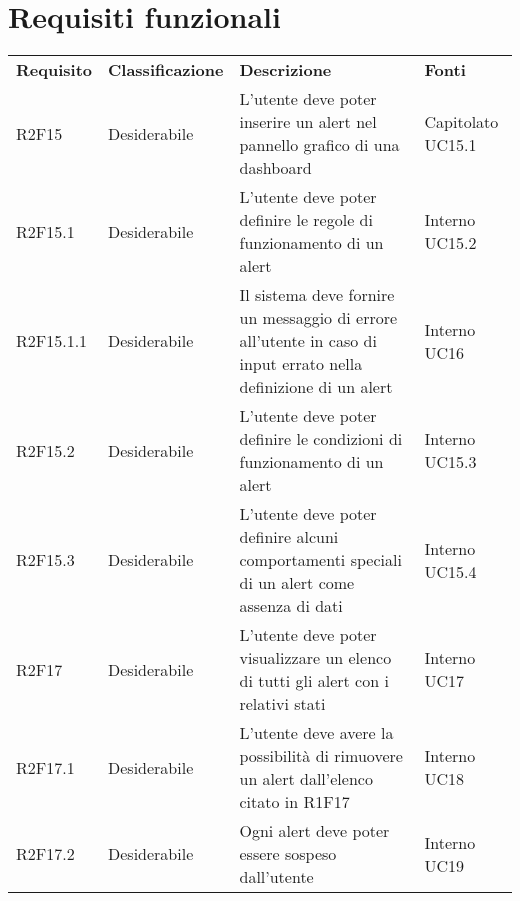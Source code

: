 \section{Requisiti funzionali}
	\begin{longtable} {
		>{}p{24mm} 
		>{}p{32mm}
		>{}p{40mm} 
		>{}p{24.5mm}
		}
	\rowcolor{gray!50}
		\textbf{Requisito} & 
		\textbf{Classificazione} & 
		\textbf{Descrizione} & 
		\textbf{Fonti} 	\TBstrut \\
			
		R2F15 &
		Desiderabile &
		L'utente deve poter inserire un alert nel pannello grafico di una dashboard\glo &
		Capitolato UC15.1 \TBstrut \\ [2mm]
		
		R2F15.1 &
		Desiderabile &
		L'utente deve poter definire le regole di funzionamento di un alert &
		Interno UC15.2 \TBstrut \\ [2mm]
		
		R2F15.1.1 &
		Desiderabile &
		Il sistema deve fornire un messaggio di errore all'utente in caso di input errato nella definizione di un alert &
		Interno UC16 \TBstrut \\ [2mm]
		
		R2F15.2 & 
		Desiderabile & 
		L'utente deve poter definire le condizioni di funzionamento di un alert &
		Interno UC15.3 \TBstrut \\ [2mm]
		
		R2F15.3 &
		Desiderabile &
		L'utente deve poter definire alcuni comportamenti speciali di un alert come assenza di dati &
		Interno UC15.4 \TBstrut \\ [2mm]
		
		R2F17 &		
		Desiderabile & 
		L'utente deve poter visualizzare un elenco di tutti gli alert con i relativi stati & 
		Interno UC17 \TBstrut \\ [2mm]
		
		R2F17.1 & 
		Desiderabile & 
		L'utente deve avere la possibilità di rimuovere un alert dall'elenco citato in R1F17 & 
		Interno UC18 \TBstrut \\ [2mm]
		
		R2F17.2 &
		Desiderabile & 
		Ogni alert deve poter essere sospeso dall'utente & 
		Interno UC19 \TBstrut \\ [2mm]
		
	\end{longtable}
